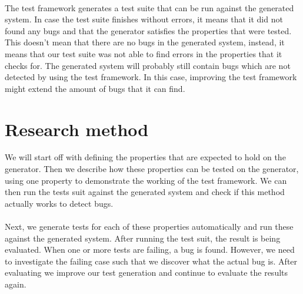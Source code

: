 \\
The test framework generates a test suite that can be run against the generated system. In case the test suite finishes without errors, it means that it did not found any bugs and that the generator satisfies the properties that were tested. This doesn't mean that there are no bugs in the generated system, instead, it means that our test suite was not able to find errors in the properties that it checks for. The generated system will probably still contain bugs which are not detected by using the test framework. In this case, improving the test framework might extend the amount of bugs that it can find.

\section{Research method}
We will start off with defining the properties that are expected to hold on the generator. Then we describe how these properties can be tested on the generator, using one property to demonstrate the working of the test framework. We can then run the tests suit against the generated system and check if this method actually works to detect bugs.\\
\\
Next, we generate tests for each of these properties automatically and run these against the generated system. After running the test suit, the result is being evaluated. When one or more tests are failing, a bug is found. However, we need to investigate the failing case such that we discover what the actual bug is. After evaluating we improve our test generation and continue to evaluate the results again.

